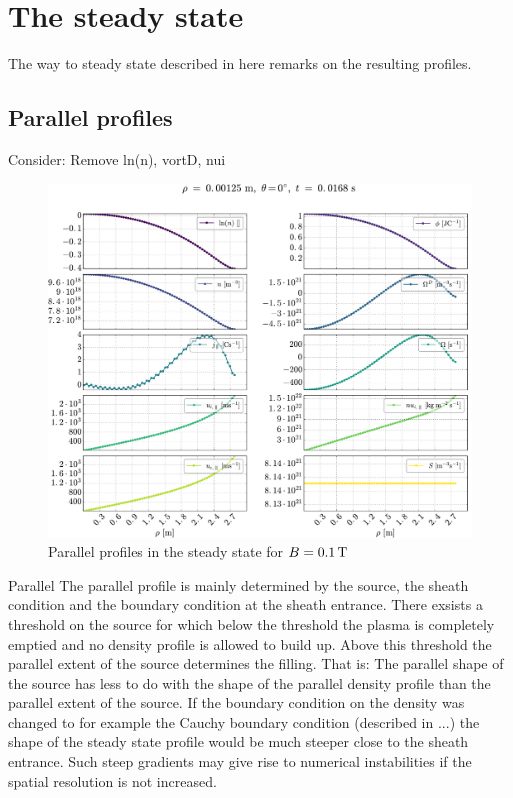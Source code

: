 \section{The steady state}

The way to steady state described in
here remarks on the resulting profiles.

\subsection{Parallel profiles}
Consider: Remove ln(n), vortD, nui
%
\begin{figure}[htb]
    \centering
    \includegraphics[width=1.0\textwidth]{fig/results/1DProfiles/B010Par}
    \caption{Parallel profiles in the steady state for $B=0.1\, \text{T}$}
    \label{fig:parProfs}
\end{figure}


Parallel
The parallel profile is mainly determined by the source, the sheath condition and the boundary condition at the sheath entrance.
There exsists a threshold on the source for which below the threshold the plasma is completely emptied and no density profile is allowed to build up.
Above this threshold the parallel extent of the source determines the filling.
That is:
The parallel shape of the source has less to do with the shape of the parallel density profile than the parallel extent of the source.
If the boundary condition on the density was changed to for example the Cauchy boundary condition (described in ...)
the shape of the steady state profile would be much steeper close to the sheath entrance.
Such steep gradients may give rise to numerical instabilities if the spatial resolution is not increased.

